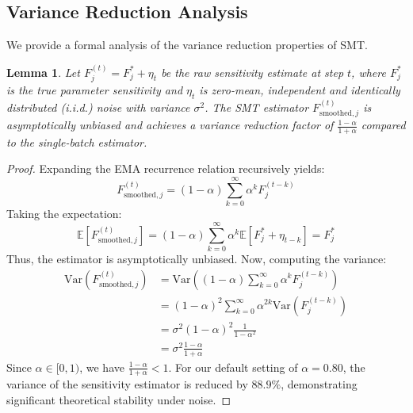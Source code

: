 \documentclass{article}
\theoremstyle{plain}
\newtheorem{lemma}[theorem]{Lemma}
\theoremstyle{definition}
\theoremstyle{remark}
\begin{document}
\subsection{Variance Reduction Analysis}
We provide a formal analysis of the variance reduction properties of SMT.
\begin{lemma}
Let $F_j^{(t)} = F_j^* + \eta_t$ be the raw sensitivity estimate at step $t$, where $F_j^*$ is the true parameter sensitivity and $\eta_t$ is zero-mean, independent and identically distributed (i.i.d.) noise with variance $\sigma^2$. The SMT estimator $F_{\text{smoothed}, j}^{(t)}$ is asymptotically unbiased and achieves a variance reduction factor of $\frac{1 - \alpha}{1 + \alpha}$ compared to the single-batch estimator.
\end{lemma}
\begin{proof}
Expanding the EMA recurrence relation recursively yields:
\begin{equation}
    F_{\text{smoothed}, j}^{(t)} = (1 - \alpha) \sum_{k=0}^{\infty} \alpha^k F_j^{(t-k)}
\end{equation}
Taking the expectation:
\begin{equation}
    \mathbb{E}[F_{\text{smoothed}, j}^{(t)}] = (1 - \alpha) \sum_{k=0}^{\infty} \alpha^k \mathbb{E}[F_j^* + \eta_{t-k}] = F_j^*
\end{equation}
Thus, the estimator is asymptotically unbiased. Now, computing the variance:
\begin{align}
    \text{Var}(F_{\text{smoothed}, j}^{(t)}) &= \text{Var}\left( (1 - \alpha) \sum_{k=0}^{\infty} \alpha^k F_j^{(t-k)} \right) \\
    &= (1 - \alpha)^2 \sum_{k=0}^{\infty} \alpha^{2k} \text{Var}(F_j^{(t-k)}) \\
    &= \sigma^2 (1 - \alpha)^2 \frac{1}{1 - \alpha^2} \\
    &= \sigma^2 \frac{1 - \alpha}{1 + \alpha}
\end{align}
Since $\alpha \in [0, 1)$, we have $\frac{1 - \alpha}{1 + \alpha} < 1$. For our default setting of $\alpha = 0.80$, the variance of the sensitivity estimator is reduced by $88.9\%$, demonstrating significant theoretical stability under noise.
\end{proof}
\end{document}
